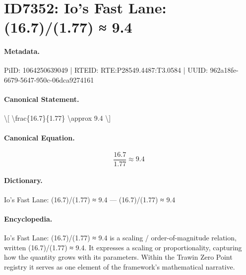 \section*{ID7352: Io’s Fast Lane: (16.7)/(1.77) ≈ 9.4}
\paragraph{Metadata.}
PiID: 1064250639049 | RTEID: RTE:P28549.4487:T3.0584 | UUID: 962a18fe-6679-5647-950c-06dca9274161

\paragraph{Canonical Statement.}
\textbackslash{}[ \textbackslash{}frac\{16.7\}\{1.77\} \textbackslash{}approx 9.4 \textbackslash{}]

\paragraph{Canonical Equation.}
\[
\frac{16.7}{1.77} \approx 9.4
\]

\paragraph{Dictionary.}
Io’s Fast Lane: (16.7)/(1.77) ≈ 9.4 — (16.7)/(1.77) ≈ 9.4

\paragraph{Encyclopedia.}
Io’s Fast Lane: (16.7)/(1.77) ≈ 9.4 is a scaling / order-of-magnitude relation, written (16.7)/(1.77) ≈ 9.4. It expresses a scaling or proportionality, capturing how the quantity grows with its parameters. Within the Trawin Zero Point registry it serves as one element of the framework's mathematical narrative.
